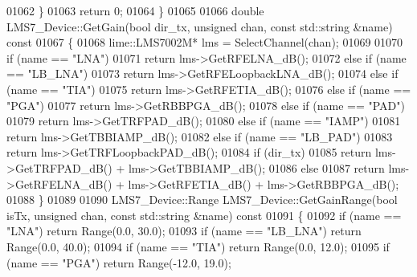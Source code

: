 \begin{DoxyCode}
{{{01062     \}
01063     \textcolor{keywordflow}{return} 0;
01064 \}
01065 
01066 \textcolor{keywordtype}{double} LMS7_Device::GetGain(\textcolor{keywordtype}{bool} dir_tx, \textcolor{keywordtype}{unsigned} chan, \textcolor{keyword}{const} std::string &name)\textcolor{keyword}{ const}
01067 \textcolor{keyword}{}\{
01068     lime::LMS7002M* lms = SelectChannel(chan);
01069 
01070     \textcolor{keywordflow}{if} (name == \textcolor{stringliteral}{"LNA"})
01071         \textcolor{keywordflow}{return} lms->GetRFELNA_dB();
01072     \textcolor{keywordflow}{else} \textcolor{keywordflow}{if} (name == \textcolor{stringliteral}{"LB\_LNA"})
01073         \textcolor{keywordflow}{return} lms->GetRFELoopbackLNA_dB();
01074     \textcolor{keywordflow}{else} \textcolor{keywordflow}{if} (name == \textcolor{stringliteral}{"TIA"})
01075         \textcolor{keywordflow}{return} lms->GetRFETIA_dB();
01076     \textcolor{keywordflow}{else} \textcolor{keywordflow}{if} (name == \textcolor{stringliteral}{"PGA"})
01077         \textcolor{keywordflow}{return} lms->GetRBBPGA_dB();
01078     \textcolor{keywordflow}{else} \textcolor{keywordflow}{if} (name == \textcolor{stringliteral}{"PAD"})
01079         \textcolor{keywordflow}{return} lms->GetTRFPAD_dB();
01080     \textcolor{keywordflow}{else} \textcolor{keywordflow}{if} (name == \textcolor{stringliteral}{"IAMP"})
01081         \textcolor{keywordflow}{return} lms->GetTBBIAMP_dB();
01082     \textcolor{keywordflow}{else} \textcolor{keywordflow}{if} (name == \textcolor{stringliteral}{"LB\_PAD"})
01083         \textcolor{keywordflow}{return} lms->GetTRFLoopbackPAD_dB();
01084     \textcolor{keywordflow}{if} (dir\_tx)
01085         \textcolor{keywordflow}{return} lms->GetTRFPAD_dB() + lms->GetTBBIAMP_dB();
01086     \textcolor{keywordflow}{else}
01087         \textcolor{keywordflow}{return} lms->GetRFELNA_dB() + lms->GetRFETIA_dB() + lms->GetRBBPGA_dB();
01088 \}
01089 
01090 LMS7_Device::Range LMS7_Device::GetGainRange(\textcolor{keywordtype}{bool} isTx, \textcolor{keywordtype}{unsigned} chan, \textcolor{keyword}{const} 
      std::string &name)\textcolor{keyword}{ const}
01091 \textcolor{keyword}{}\{
01092     \textcolor{keywordflow}{if} (name == \textcolor{stringliteral}{"LNA"}) \textcolor{keywordflow}{return} Range(0.0, 30.0);
01093     \textcolor{keywordflow}{if} (name == \textcolor{stringliteral}{"LB\_LNA"}) \textcolor{keywordflow}{return} Range(0.0, 40.0);
01094     \textcolor{keywordflow}{if} (name == \textcolor{stringliteral}{"TIA"}) \textcolor{keywordflow}{return} Range(0.0, 12.0);
01095     \textcolor{keywordflow}{if} (name == \textcolor{stringliteral}{"PGA"}) \textcolor{keywordflow}{return} Range(-12.0, 19.0);
}}}
\end{DoxyCode}
